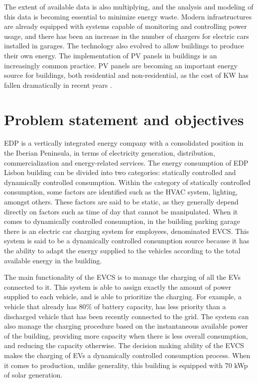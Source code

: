 The extent of available data is also multiplying, and the analysis and modeling of this data is becoming essential to minimize energy waste. Modern infrastructures are already equipped with systems capable of monitoring and controlling power usage, and there has been an increase in the number of chargers for electric cars installed in garages. The technology also evolved to allow buildings to produce their own energy. The implementation of \ac{PV} panels in buildings is an increasingly common practice. \ac{PV} panels are becoming an important energy source for buildings, both  residential and non-residential, as the cost of KW has fallen dramatically in recent years \cite{pvedp}. 









\section{Problem statement and objectives}


\ac{EDP} is a vertically integrated energy company with a consolidated position in the Iberian Peninsula, in terms of electricity generation, distribution, commercialization and energy-related services. The energy consumption of \ac{EDP} Lisbon building can be divided into two categories: statically controlled and dynamically controlled consumption. Within the category of statically controlled consumption, some factors are identified such as the \ac{HVAC} system, lighting, amongst others. These factors are said to be static, as they generally depend directly on factors such as time of day that cannot be manipulated. When it comes to dynamically controlled consumption, in the building parking garage there is an electric car charging system for employees, denominated \ac{EVCS}. This system is said to be a dynamically controlled consumption source because it has the ability to adapt the energy supplied to the vehicles according to the total available energy in the building. 

The main functionality of the \ac{EVCS} is to manage the charging of all the \ac{EV}s connected to it. This system is able to assign exactly the amount of power supplied to each vehicle, and is able to prioritize the charging. For example, a vehicle that already has 80$\%$ of battery capacity, has less priority than a discharged vehicle that has been recently connected to the grid. The system can also manage the charging procedure based on the instantaneous available power of the building, providing more capacity when there is less overall consumption, and reducing the capacity otherwise. The decision making ability of the \ac{EVCS} makes the charging of \ac{EV}s a dynamically controlled consumption process. When it comes to production, unlike generality, this building is equipped with 70 kWp of solar generation. 



